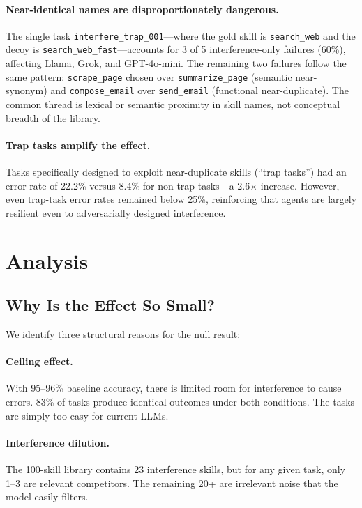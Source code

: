 \documentclass[11pt]{article}
\begin{document}
\paragraph{Near-identical names are disproportionately dangerous.}
The single task \texttt{interfere\_trap\_001}---where the gold skill is \texttt{search\_web} and the decoy is \texttt{search\_web\_fast}---accounts for 3 of 5 interference-only failures (60\%), affecting Llama, Grok, and GPT-4o-mini. The remaining two failures follow the same pattern: \texttt{scrape\_page} chosen over \texttt{summarize\_page} (semantic near-synonym) and \texttt{compose\_email} over \texttt{send\_email} (functional near-duplicate). The common thread is lexical or semantic proximity in skill names, not conceptual breadth of the library.

\paragraph{Trap tasks amplify the effect.}
Tasks specifically designed to exploit near-duplicate skills (``trap tasks'') had an error rate of 22.2\% versus 8.4\% for non-trap tasks---a 2.6$\times$ increase. However, even trap-task error rates remained below 25\%, reinforcing that agents are largely resilient even to adversarially designed interference.


\section{Analysis}

\subsection{Why Is the Effect So Small?}

We identify three structural reasons for the null result:

\paragraph{Ceiling effect.} With 95--96\% baseline accuracy, there is limited room for interference to cause errors. 83\% of tasks produce identical outcomes under both conditions. The tasks are simply too easy for current LLMs.

\paragraph{Interference dilution.} The 100-skill library contains 23 interference skills, but for any given task, only 1--3 are relevant competitors. The remaining 20+ are irrelevant noise that the model easily filters.
\end{document}

